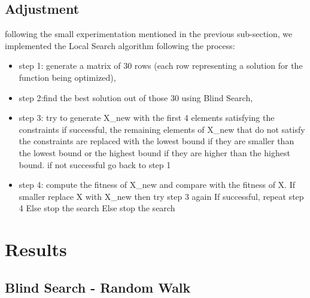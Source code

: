 \documentclass[12pt]{article}
\begin{document}
		\subsection{Adjustment}
			following the small experimentation mentioned in the previous sub-section, we implemented the Local Search algorithm following the process:
			\begin{itemize}
				\item step 1: generate a matrix of 30 rows (each row representing a solution for the function being optimized),
				\item step 2:find the best solution out of those 30 using Blind Search,
				\item step 3: try to generate X\_new with the first 4 elements satisfying the constraints
					\subitem if successful, the remaining elements of X\_new that do not satisfy the constraints are replaced with the lowest bound if they are smaller than the lowest bound or the highest bound if they are higher than the highest bound.
					\subitem if not successful go back to step 1
				\item step 4: compute the fitness of X\_new and compare with the fitness of X. 
					\subitem If smaller replace X with X\_new then try step 3 again
						\subsubitem If successful, repeat step 4
						\subsubitem Else stop the search
					\subitem Else stop the search
			\end{itemize}
		
	\section{Results}
	
		\subsection{Blind Search - Random Walk}
		
\end{document}
